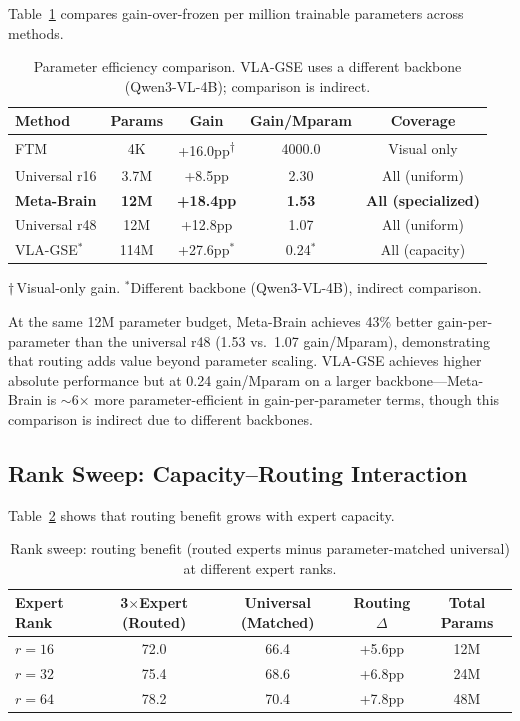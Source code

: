 \documentclass[10pt,twocolumn]{article}
\begin{document}
Table~\ref{tab:param_eff} compares gain-over-frozen per million trainable parameters across methods.

\begin{table}[h]
\centering
\caption{Parameter efficiency comparison. VLA-GSE uses a different backbone (Qwen3-VL-4B); comparison is indirect.}
\label{tab:param_eff}
\small
\begin{tabular}{lcccc}
\toprule
Method & Params & Gain & Gain/Mparam & Coverage \\
\midrule
FTM & 4K & +16.0pp\textsuperscript{$\dagger$} & 4000.0 & Visual only \\
Universal r16 & 3.7M & +8.5pp & 2.30 & All (uniform) \\
\textbf{Meta-Brain} & \textbf{12M} & \textbf{+18.4pp} & \textbf{1.53} & \textbf{All (specialized)} \\
Universal r48 & 12M & +12.8pp & 1.07 & All (uniform) \\
VLA-GSE$^*$ & 114M & +27.6pp$^*$ & 0.24$^*$ & All (capacity) \\
\bottomrule
\end{tabular}
\begin{flushleft}
\small $\dagger$\,Visual-only gain. $^*$Different backbone (Qwen3-VL-4B), indirect comparison.
\end{flushleft}
\end{table}

At the same 12M parameter budget, Meta-Brain achieves 43\% better gain-per-parameter than the universal r48 (1.53 vs.\ 1.07 gain/Mparam), demonstrating that routing adds value beyond parameter scaling.
VLA-GSE achieves higher absolute performance but at 0.24 gain/Mparam on a larger backbone---Meta-Brain is ${\sim}$6$\times$ more parameter-efficient in gain-per-parameter terms, though this comparison is indirect due to different backbones.

\subsection{Rank Sweep: Capacity--Routing Interaction}
\label{sec:rank_sweep}

Table~\ref{tab:rank_sweep} shows that routing benefit grows with expert capacity.

\begin{table}[h]
\centering
\caption{Rank sweep: routing benefit (routed experts minus parameter-matched universal) at different expert ranks.}
\label{tab:rank_sweep}
\small
\begin{tabular}{lcccc}
\toprule
Expert Rank & 3$\times$Expert (Routed) & Universal (Matched) & Routing $\Delta$ & Total Params \\
\midrule
$r{=}16$ & 72.0 & 66.4 & +5.6pp & 12M \\
$r{=}32$ & 75.4 & 68.6 & +6.8pp & 24M \\
$r{=}64$ & 78.2 & 70.4 & +7.8pp & 48M \\
\bottomrule
\end{tabular}
\end{table}
\end{document}
